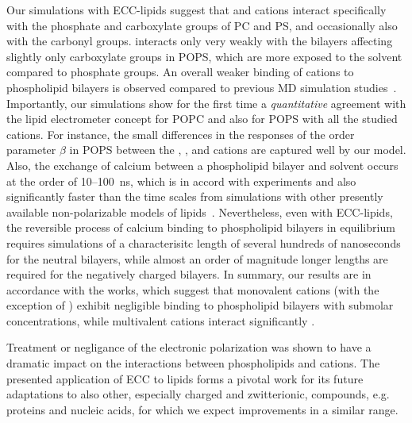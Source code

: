 Our simulations with ECC-lipids suggest that
 and  cations
interact specifically with the phosphate and carboxylate groups of PC and PS, 
and occasionally also with the carbonyl groups. 
 interacts only very weakly with the bilayers
affecting slightly only carboxylate groups in POPS,
which are more exposed to the solvent compared to phosphate groups. 
An overall weaker binding of cations to phospholipid bilayers is observed 
compared to previous MD simulation studies~\citep{nmrlipids_proj4, catte16, bockmann03, bockmann04, melcrova16, javanainen17}. 
Importantly,
our simulations show for the first time a \emph{quantitative} agreement with the lipid electrometer concept
for POPC and also for POPS with all the studied cations. 
For instance, the small differences 
in the responses of the order parameter $\beta$ in POPS
between the 
, , and  cations
are captured well by our model. 
Also, the exchange of calcium between a phospholipid bilayer and solvent 
occurs at the order of 10--100~ns, 
which is in accord with experiments and also 
significantly faster than the time scales from simulations 
with other presently available non-polarizable models of lipids~\citep{melcrova16, javanainen17, catte16}. 
Nevertheless, even with ECC-lipids,
the reversible process of calcium binding to phospholipid bilayers in equilibrium
requires simulations of a characterisitc length of several hundreds of nanoseconds 
for the neutral bilayers,
while almost an order of magnitude longer lengths 
are required for the negatively charged bilayers. 
In summary,
our results are in accordance with the works,
which suggest that monovalent cations (with the exception of ) 
exhibit negligible binding to phospholipid bilayers with submolar concentrations, 
while multivalent cations interact significantly 
\citep{cevc90,tocanne90, hauser76,hauser78,herbette84,altenbach84,clarke99,binder02,pabst07,uhrikova08,filippov09}.


Treatment or negligance of the electronic polarization 
was shown to have a dramatic impact on the interactions
between phospholipids and cations. 
The presented application of ECC to lipids
forms a pivotal work for its future adaptations 
to also other, especially charged and zwitterionic, compounds, 
e.g. proteins and nucleic acids,
for which we expect improvements in a similar range. 


